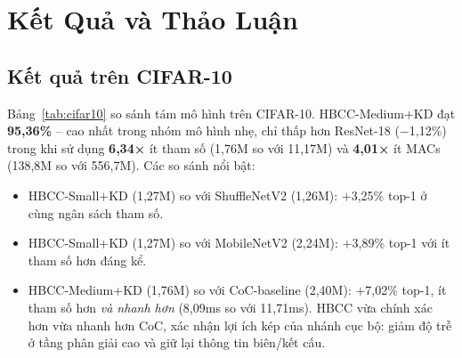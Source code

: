 \documentclass[journal]{IEEEtran}
\begin{document}
\section{Kết Quả và Thảo Luận}
\label{sec:results}

\subsection{Kết quả trên CIFAR-10}

Bảng~\ref{tab:cifar10} so sánh tám mô hình trên CIFAR-10.
HBCC-Medium+KD đạt \textbf{95,36\%} -- cao nhất trong nhóm mô hình
nhẹ, chỉ thấp hơn ResNet-18 ($-$1,12\%) trong khi sử dụng
\textbf{6,34×} ít tham số (1,76M so với 11,17M) và
\textbf{4,01×} ít MACs (138,8M so với 556,7M). Các so sánh nổi bật:

\begin{itemize}
  \item HBCC-Small+KD (1,27M) so với ShuffleNetV2 (1,26M):
        $+$3,25\% top-1 ở cùng ngân sách tham số.
  \item HBCC-Small+KD (1,27M) so với MobileNetV2 (2,24M):
        $+$3,89\% top-1 với ít tham số hơn đáng kể.
  \item HBCC-Medium+KD (1,76M) so với CoC-baseline (2,40M):
        $+$7,02\% top-1, ít tham số hơn \emph{và nhanh hơn} (8,09ms
        so với 11,71ms). HBCC vừa chính xác hơn vừa nhanh hơn CoC,
        xác nhận lợi ích kép của nhánh cục bộ: giảm độ trễ ở tầng
        phân giải cao và giữ lại thông tin biên/kết cấu.
\end{itemize}

\begin{table}[!t]
  \caption{So sánh trên CIFAR-10. \textbf{In đậm}: tốt nhất trong
           nhóm nhẹ. \texttt{+KD}: huấn luyện với chưng cất tri thức.}
  \label{tab:cifar10}
  \centering
  \renewcommand{\arraystretch}{1.15}
\end{table}
\end{document}

